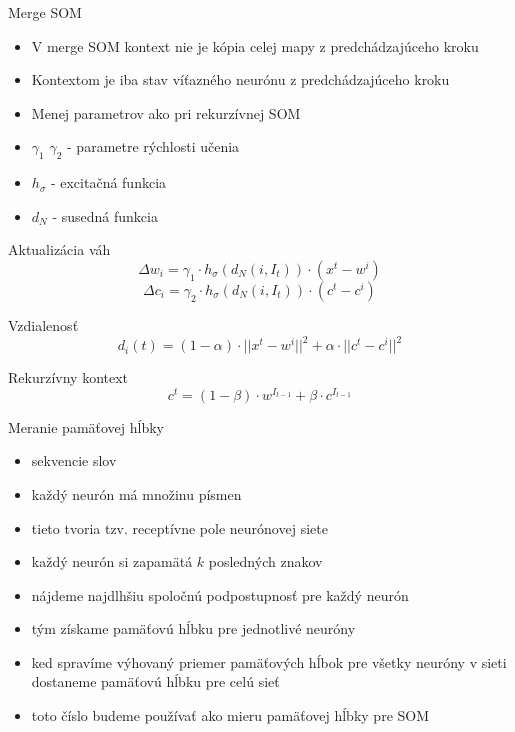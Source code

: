 \documentclass[10pt]{beamer}
\begin{document}
\begin{frame}[fragile]{Merge SOM}

\begin{itemize}
\item V merge SOM kontext nie je kópia celej mapy z predchádzajúceho kroku
\item Kontextom je iba stav víťazného neurónu z predchádzajúceho kroku
\item Menej parametrov ako pri rekurzívnej SOM
\item $\gamma_1$ $\gamma_2$ - parametre rýchlosti učenia
\item $h_{\sigma}$ - excitačná funkcia
\item $d_N$ - susedná funkcia
\end{itemize}
Aktualizácia váh
\begin{equation*}
\Delta w_i = \gamma_{1} \cdot h_{\sigma}(d_{N}(i, I_{t})) \cdot (x^t - w^i)
\end{equation*}
\begin{equation*}
\Delta c_i = \gamma_{2} \cdot h_{\sigma}(d_{N}(i, I_{t})) \cdot (c^t - c^i)
\end{equation*}

Vzdialenosť
\begin{equation*}
d_i(t) = (1-\alpha) \cdot ||x^t - w^i||^2 + \alpha \cdot ||c^t - c^i||^2
\end{equation*}

Rekurzívny kontext
\begin{equation*}
c^t = (1 - \beta) \cdot w^{I_{t-1}} + \beta \cdot c^{I_{t-1}}
\end{equation*}
\end{frame}

\begin{frame}[fragile]{Meranie pamäťovej hĺbky}

\begin{itemize}
\item sekvencie slov
\item každý neurón má množinu písmen
\item tieto tvoria tzv. receptívne pole neurónovej siete
\item každý neurón si zapamätá $k$ posledných znakov
\item nájdeme najdlhšiu spoločnú podpostupnosť pre každý neurón
\item tým získame pamäťovú hĺbku pre jednotlivé neuróny
\item ked spravíme výhovaný priemer pamäťových hĺbok pre všetky neuróny v sieti dostaneme pamäťovú hĺbku pre celú sieť
\item toto číslo budeme používať ako mieru pamäťovej hĺbky pre SOM
\end{itemize}

\end{frame}
\end{document}
